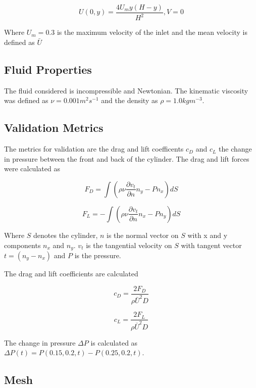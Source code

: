 \documentclass{article}
\begin{document}
\begin{equation}
U(0, y) = \frac{4 U_m y (H - y)}{H^2} , V = 0
\end{equation}

Where $U_m = 0.3$ is the maximum velocity of the inlet and the mean velocity is defined as $\bar{U}$ 

\subsection{Fluid Properties}
The fluid considered is incompressible and Newtonian. The kinematic viscosity was defined as $\nu = 0.001 m^2s^{-1}$ and the density as $ \rho = 1.0 kg m^{-3}$. 

\subsection{Validation Metrics}
The metrics for validation are the drag and lift coefficents $c_D$ and $c_L$ the change in pressure between the front and back of the cylinder. The drag and lift forces were calculated as 

\begin{equation}
F_D = \int ( \rho \nu \frac{\partial v_t}{\partial n}  n_y - P n_x ) dS
\end{equation}

\begin{equation}
F_L = - \int ( \rho \nu \frac{\partial v_t}{\partial n}  n_x - P n_y ) dS
\end{equation}

Where $S$ denotes the cylinder, $n$ is the normal vector on $S$ with x and y components $n_x$ and $n_y$. $v_t$ is the tangential velocity on $S$ with tangent vector $t = (n_y - n_x)$ and $P$ is the pressure. 

The drag and lift coefficients are calculated

\begin{equation}
c_D = \frac{2 F_D}{\rho \bar{U}^2 D}
\end{equation}

\begin{equation}
c_L = \frac{2 F_L}{\rho \bar{U}^2 D}
\end{equation}

The change in pressure $\Delta P$ is calculated as $\Delta P(t) = P(0.15, 0.2, t) -  P(0.25, 0.2, t)$. 

\subsection{Mesh}
\end{document}
